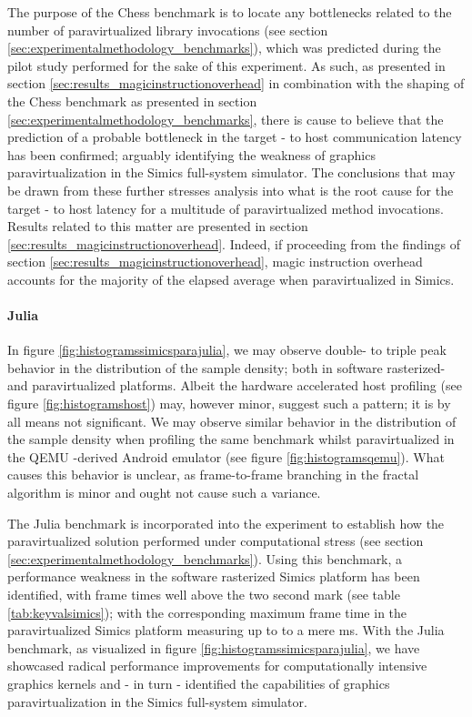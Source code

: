 The purpose of the Chess benchmark is to locate any bottlenecks related to the number of paravirtualized library invocations (see section \ref{sec:experimentalmethodology_benchmarks}), which was predicted during the pilot study performed for the sake of this experiment.
As such, as presented in section \ref{sec:results_magicinstructionoverhead} in combination with the shaping of the Chess benchmark as presented in section \ref{sec:experimentalmethodology_benchmarks}, there is cause to believe that the prediction of a probable bottleneck in the target - to host communication latency has been confirmed; arguably identifying the weakness of graphics paravirtualization in the Simics full-system simulator.
The conclusions that may be drawn from these further stresses analysis into what is the root cause for the target - to host latency for a multitude of paravirtualized method invocations.
Results related to this matter are presented in section \ref{sec:results_magicinstructionoverhead}. 
Indeed, if proceeding from the findings of section \ref{sec:results_magicinstructionoverhead}, magic instruction overhead accounts for the majority of the elapsed average when paravirtualized in Simics.

\paragraph{Julia}
\label{par:results_julia}
In figure \ref{fig:histogramssimicsparajulia}, we may observe double- to triple peak behavior in the distribution of the sample density; both in software rasterized- and paravirtualized platforms.
Albeit the hardware accelerated host profiling (see figure \ref{fig:histogramshost}) may, however minor, suggest such a pattern; it is by all means not significant.
We may observe similar behavior in the distribution of the sample density when profiling the same benchmark whilst paravirtualized in the QEMU -derived Android emulator (see figure \ref{fig:histogramsqemu}).
What causes this behavior is unclear, as frame-to-frame branching in the fractal algorithm is minor and ought not cause such a variance.

The Julia benchmark is incorporated into the experiment to establish how the paravirtualized solution performed under computational stress (see section \ref{sec:experimentalmethodology_benchmarks}).
Using this benchmark, a performance weakness in the software rasterized Simics platform has been identified, with frame times well above the two second mark (see table \ref{tab:keyvalsimics}); with the corresponding maximum frame time in the paravirtualized Simics platform measuring up to to a mere  ms.
With the Julia benchmark, as visualized in figure \ref{fig:histogramssimicsparajulia}, we have showcased radical performance improvements for computationally intensive graphics kernels and - in turn - identified the capabilities of graphics paravirtualization in the Simics full-system simulator.

